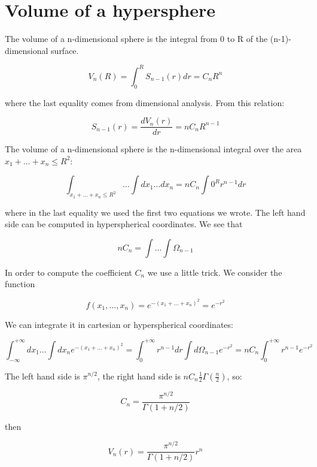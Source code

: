 \documentclass[a4paper, italian, openany]{book}
\begin{document}
\appendix
\chapter{Volume of a hypersphere}

The volume of a n-dimensional sphere is the integral from 0 to R of the (n-1)-dimensional surface.

$$V_n(R) = \int_{0}^{R} S_{n-1}(r)dr = C_n R^n$$

where the last equality comes from dimensional analysis. From this relation:

$$S_{n-1}(r) = \frac{dV_n(r)}{dr} = n C_n R^{n-1}$$

The volume of a n-dimensional sphere is the n-dimensional integral over the area $x_1 + \ldots +x_n \le R^2$:

$$\int _{x_1 + \ldots +x_n \le R^2} \ldots \int dx_1 \ldots dx_n = nC_n \int{0}^{R} r^{n-1}dr$$

where in the last equality we used the first two equations we wrote.\newline
The left hand side can be computed in hyperspherical coordinates. We see that

$$n C_n =\int \ldots \int \Omega_{n-1}$$

In order to compute the coefficient $C_n$ we use a little trick. We consider the function

$$f(x_1, \ldots, x_n) = e^{-(x_1+\ldots+x_n)^2}=e^{-r^2}$$

We can integrate it in cartesian or hyperspherical coordinates:

$$\int_{-\infty}^{+\infty} dx_1 \ldots \int dx_n e^{-(x_1+\ldots+x_n)^2} = \int_{0}^{+\infty}r^{n-1}dr \int d\Omega_{n-1} e^{-r^2} = n C_n \int_{0}^{+\infty} r^{n-1} e^{-r^2}$$

The left hand side is $\pi^{n/2}$, the right hand side is $n C_n \frac{1}{2} \Gamma(\frac{n}{2})$, so:

$$C_n = \frac{\pi^{n/2}}{\Gamma(1+n/2)}$$

then 

$$V_n(r) = \frac{\pi^{n/2}}{\Gamma(1+n/2)} r^n$$
\end{document}
